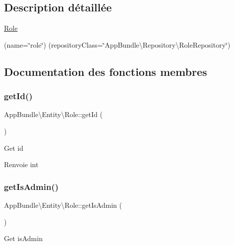 \subsection{Description détaillée}
\hyperlink{classAppBundle_1_1Entity_1_1Role}{Role}

(name=\char`\"{}role\char`\"{}) (repository\+Class=\char`\"{}\+App\+Bundle\textbackslash{}\+Repository\textbackslash{}\+Role\+Repository\char`\"{}) 

\subsection{Documentation des fonctions membres}
\mbox{\label{classAppBundle_1_1Entity_1_1Role_ab30a055916446a86d21cbc622e29b91e}} 
\subsubsection{\texorpdfstring{get\+Id()}{getId()}}
{\footnotesize\ttfamily App\+Bundle\textbackslash{}\+Entity\textbackslash{}\+Role\+::get\+Id (\begin{DoxyParamCaption}{ }\end{DoxyParamCaption})}

Get id

\begin{DoxyReturn}{Renvoie}
int 
\end{DoxyReturn}
\mbox{\label{classAppBundle_1_1Entity_1_1Role_a1c6633761909eb4de1c9bf91c4b739ff}} 
\subsubsection{\texorpdfstring{get\+Is\+Admin()}{getIsAdmin()}}
{\footnotesize\ttfamily App\+Bundle\textbackslash{}\+Entity\textbackslash{}\+Role\+::get\+Is\+Admin (\begin{DoxyParamCaption}{ }\end{DoxyParamCaption})}

Get is\+Admin

